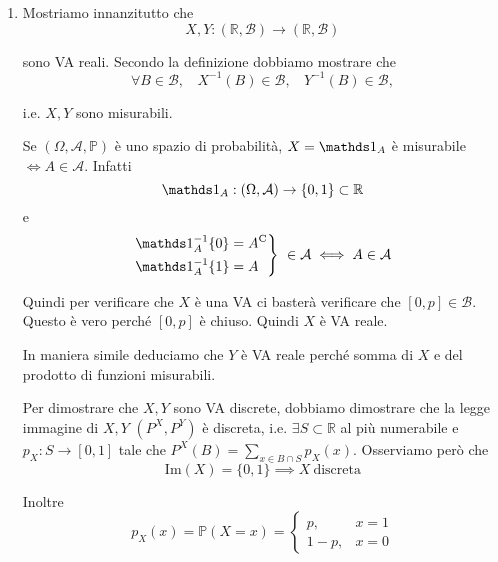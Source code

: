 \ParteSoluzioni






\Soluzione
\begin{enumerate}
\item Mostriamo innanzitutto che\begin{equation*}
X,Y:(\mathbb{R} ,\mathcal{B})\rightarrow (\mathbb{R} ,\mathcal{B})
\end{equation*}

sono VA reali. Secondo la definizione dobbiamo mostrare che\begin{equation*}
\forall B\in \mathcal{B} ,\ \ \ \ X^{-1}( B) \in \mathcal{B} ,\ \ \ \ Y^{-1}( B) \in \mathcal{B} ,
\end{equation*}

i.e. $X,Y$ sono misurabili.\begin{oss}
Se $( \Omega ,\mathcal{A} ,\mathbb{P})$ è uno spazio di probabilità, $X=\Ind_{A}$ è misurabile $\iff A\in \mathcal{A}$. Infatti
\begin{equation*}
\Ind_{A} :( \Omega ,\mathcal{A})\rightarrow \{0,1\} \subset \mathbb{R}
\end{equation*}
e
\begin{equation*}
\begin{drcases}
\Ind_{A}^{-1}\{0\} =A\comp\\
\Ind_{A}^{-1}\{1\} =A
\end{drcases} \ \in \mathcal{A} \iff A\in \mathcal{A}
\end{equation*}
\end{oss}

Quindi per verificare che $X$ è una VA ci basterà verificare che $[ 0,p] \in \mathcal{B}$. Questo è vero perché $[ 0,p]$ è chiuso. Quindi $X$ è VA reale.

In maniera simile deduciamo che $Y$ è VA reale perché somma di $X$ e del prodotto di funzioni misurabili.

Per dimostrare che $X,Y$ sono VA discrete, dobbiamo dimostrare che la legge immagine di $X,Y$ $\left( P^{X} ,P^{Y}\right)$ è discreta, i.e. $\exists S\subset \mathbb{R}$ al più numerabile e $p_{X} :S\rightarrow [ 0,1]$ tale che $P^{X}( B) =\sum\limits _{x\in B\cap S} p_{X}( x)$. Osserviamo però che\begin{equation*}
\mathrm{Im}( X) =\{0,1\} \implies X\ \text{discreta}
\end{equation*}

Inoltre\begin{equation*}
p_{X}( x) =\mathbb{P}( X=x) =\begin{cases}
p, & x=1\\
1-p, & x=0
\end{cases}
\end{equation*}


\end{enumerate}

